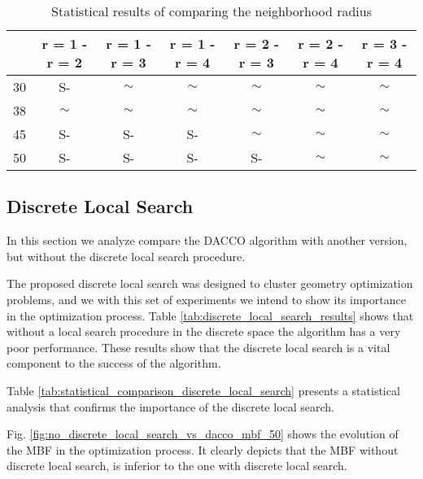 \begin{landscape}
			\begin{table}[!htdp]
					\begin{center}
						\begin{tabular}{| c | c | c | c | c | c | c |}
							\hline
							~& \textbf{r = 1 - r = 2} & \textbf{r = 1 - r = 3} & \textbf{r = 1 - r = 4} & \textbf{r = 2 - r = 3} & \textbf{r = 2 - r = 4} & \textbf{r = 3 - r = 4} \\ \hline
							30 & S- & $\sim$ & $\sim$ & $\sim$ & $\sim$ & $\sim$ \\ \hline
							38 & $\sim$ & $\sim$ & $\sim$ & $\sim$ & $\sim$ & $\sim$ \\ \hline
							45 & S- & S- & S- & $\sim$ & $\sim$ & $\sim$ \\ \hline
							50 & S- & S- & S- & S- & $\sim$ & $\sim$ \\ \hline
						\end{tabular}
						\caption{Statistical results of comparing the neighborhood radius}
						\label{tab:statistical_comparison_radius}
					\end{center}
			\end{table}
			
			\end{landscape}
			
		\subsection{Discrete Local Search}
		
		In this section we analyze compare the DACCO algorithm with another version, but without the discrete local search procedure. 
		
		The proposed discrete local search was designed to cluster geometry optimization problems, and we with this set of experiments we intend to show its importance in the optimization process.
		Table \ref{tab:discrete_local_search_results} shows that without a local search procedure in the discrete space the algorithm has a very poor performance. These results show that the discrete local search is a vital component to the success of the algorithm. 
		
		Table \ref{tab:statistical_comparison_discrete_local_search} presents a statistical analysis that confirms the importance of the discrete local search. 
		
		Fig. \ref{fig:no_discrete_local_search_vs_dacco_mbf_50} shows the evolution of the MBF in the optimization process. It clearly depicts that the MBF without discrete local search, is inferior to the one with discrete local search.
		
